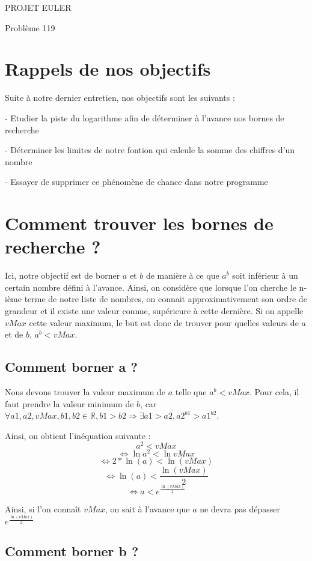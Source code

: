 \documentclass{article}
\begin{document}
\hfill
\hfill
\hfill
\begin{center}
  \large{PROJET EULER}

  Problème 119
\end{center}
\tableofcontents
\section {Rappels de nos objectifs}
Suite à notre dernier entretien, nos objectifs sont les suivants :

- Etudier la piste du logarithme afin de déterminer à l'avance nos bornes de recherche

- Déterminer les limites de notre fontion qui calcule la somme des chiffres d'un nombre

- Essayer de supprimer ce phénomène de chance dans notre programme

\section{Comment trouver les bornes de recherche ?}

Ici, notre objectif est de borner $a$ et $b$ de manière à ce que $a^{b}$ soit inférieur à un certain nombre défini à l'avance. Ainsi, on considère que lorsque l'on cherche le n-ième terme de notre liste de nombres, on connait approximativement son ordre de grandeur et il existe une valeur connue, supérieure à cette dernière. Si on appelle $vMax$ cette valeur maximum, le but est donc de trouver pour quelles valeurs de $a$ et de $b$, $a^{b}  < vMax$.

\subsection{Comment borner a ?}

	Nous devons trouver la valeur maximum de $a$ telle que $a^{b} < vMax$. Pour cela, il faut prendre la valeur minimum de $b$, car $\forall a1, a2, vMax, b1, b2 \in \mathbb{R}, b1 > b2 \Rightarrow \exists a1 > a2, a2^{b1} > a1^{b2}$.

Ainsi, on obtient l'inéquation suivante : \[ a^{2} < vMax \]
 \[ \Leftrightarrow \ln{a^{2}} < \ln{vMax} \]
\[ \Leftrightarrow 2*\ln(a) < \ln(vMax)  \]
\[ \Leftrightarrow \ln(a) < \frac{\ln(vMax)}{2}  \]
\[  \Leftrightarrow a < e^{\frac{\ln(vMax)}{2}} \]

Ainsi, si l'on connaît $vMax$, on sait à l'avance que $a$ ne devra pas dépasser $e^{\frac{\ln(vMax)}{2}}$


\subsection{Comment borner b ?}
\end{document}

